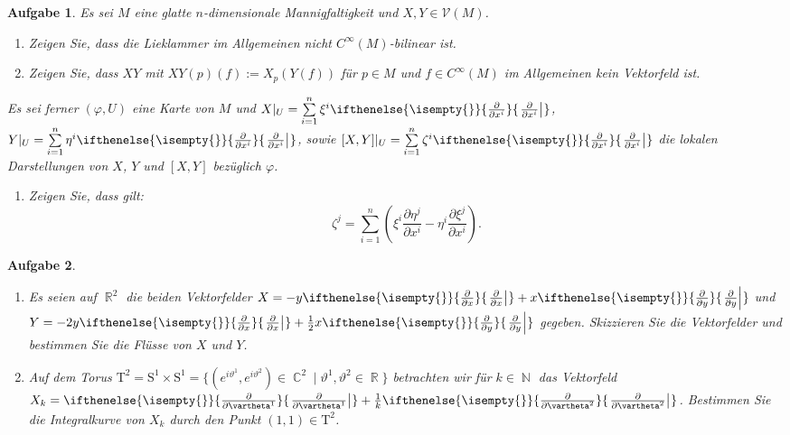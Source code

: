 \documentclass[paper=A4, twoside, chapterprefix=true, bibliography=totoc, headsepline]{scrbook}
\let\temp\phi{}
\let\phi\varphi{}
\let\varphi\temp{}
\let\temp\theta{}
\let\theta\vartheta{}
\let\vartheta\temp{}
\let\temp\epsilon{}
\let\epsilon\varepsilon{}
\let\varepsilon\temp{}
\let\temp\rho{}
\let\rho\varrho{}
\let\varrho\temp{}
\DeclareMathOperator{\C}{\mathbb{C}}
\DeclareMathOperator{\N}{\mathbb{N}}
\DeclareMathOperator{\R}{\mathbb{R}}
\newcommand{\pdifffrac}[3][]{\ifthenelse{\isempty{#1}}{\frac{\partial #2}{\partial #3}}{\left. \frac{\partial #2}{\partial #3} \right|_{#1}}}
\theoremstyle{plain}
\theoremstyle{nonumberplain}
\theoremstyle{empty}
\theoremstyle{break}
\newtheorem{Aufg}{Aufgabe}
\begin{document}
\begin{Aufg}
Es sei $M$ eine glatte $n$-dimensionale Mannigfaltigkeit und $X,Y \in \mathcal{V}(M)$.
\begin{enumerate}[label=\alph*),leftmargin=*,widest=b]
\item
	Zeigen Sie, dass die Lieklammer im Allgemeinen nicht $C^{\infty}(M)$-bilinear ist.
\item
	Zeigen Sie, dass $XY$ mit $XY(p)(f):=X_p(Y(f))$ für $p \in M$ und $f\in C^\infty(M)$ im Allgemeinen kein Vektorfeld ist.
\end{enumerate}
Es sei ferner $(\phi,U)$  eine Karte von $M$ und $X|_U=\sum\limits_{i=1}^n \xi^i \pdifffrac{}{x^i}$, $Y|_U=\sum\limits_{i=1}^n \eta^i \pdifffrac{}{x^i}$, sowie $[X,Y]|_U=\sum\limits_{i=1}^n \zeta^i \pdifffrac{}{x^i}$ die lokalen Darstellungen von $X$, $Y$ und $[X,Y]$ bezüglich $\phi$.
\begin{enumerate}[label=\alph*),leftmargin=*,widest=b]
\item[c)]
	Zeigen Sie, dass gilt: 
		\[\zeta^j=\sum_{i=1}^n \left(\xi^i \frac{\partial \eta^j}{\partial x^i} - \eta^i \frac{\partial \xi^j}{\partial x^i}\right).\]
\end{enumerate}\end{Aufg}

\begin{Aufg}\begin{enumerate}[label=\alph*),leftmargin=*,widest=b]
\item
	Es seien auf $\R^2$ die beiden Vektorfelder $X=-y \pdifffrac{}{x}+x \pdifffrac{}{y}$ und $Y=-2 y \pdifffrac{}{x}+\tfrac{1}{2} x \pdifffrac{}{y}$ gegeben. Skizzieren Sie die Vektorfelder und bestimmen Sie die Flüsse von $X$ und $Y$.
\item
	Auf dem Torus $\mathrm{T}^2=\mathrm{S}^1 \times \mathrm{S}^1=\{(e^{i \theta^1}, e^{i \theta^2})\in \C^2 \mid \theta^1, \theta^2 \in \R\}$ betrachten wir für $k \in \N$  das Vektorfeld $X_k=\pdifffrac{}{\theta^1}+ \tfrac{1}{k}\pdifffrac{}{\theta^2}$. Bestimmen Sie die Integralkurve von $X_k$ durch den Punkt $(1,1) \in \mathrm{T}^2$.
\end{enumerate}\end{Aufg}
\end{document}
